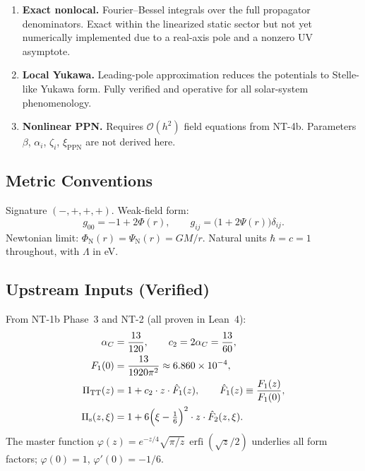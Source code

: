 \documentclass[11pt,a4paper]{article}
\newcommand{\PiTT}{\Pi_{\mathrm{TT}}}
\newcommand{\Pis}{\Pi_{\mathrm{s}}}
\newcommand{\Fhat}{\hat{F}}
\newcommand{\order}{\mathcal{O}}
\newcommand{\erfi}{\operatorname{erfi}}
\begin{document}
\begin{enumerate}[label=\textbf{Level \arabic*}:, leftmargin=4em]
  \item \textbf{Exact nonlocal.}  Fourier--Bessel integrals over the full
    propagator denominators.  Exact within the linearized static sector but
    not yet numerically implemented due to a real-axis pole and a nonzero
    UV asymptote.

  \item \textbf{Local Yukawa.}  Leading-pole approximation reduces the
    potentials to Stelle-like Yukawa form.  Fully verified and operative
    for all solar-system phenomenology.

  \item \textbf{Nonlinear PPN.}  Requires $\order(h^2)$ field equations
    from NT-4b.  Parameters $\beta$, $\alpha_i$, $\zeta_i$,
    $\xi_\mathrm{PPN}$ are not derived here.
\end{enumerate}

\subsection{Metric Conventions}

Signature $(-,+,+,+)$.  Weak-field form:
\begin{equation}\label{eq:metric}
  g_{00} = -1 + 2\Phi(r), \qquad
  g_{ij} = \bigl(1 + 2\Psi(r)\bigr)\delta_{ij}.
\end{equation}
Newtonian limit: $\Phi_{\mathrm{N}}(r) = \Psi_{\mathrm{N}}(r) = GM/r$.
Natural units $\hbar = c = 1$ throughout, with $\Lambda$ in eV.

\subsection{Upstream Inputs (Verified)}

From NT-1b Phase~3 and NT-2 (all proven in Lean~4):
\begin{align}
  \alpha_C &= \frac{13}{120}, \qquad
  c_2 = 2\alpha_C = \frac{13}{60}, \label{eq:alpha_c2} \\
  F_1(0) &= \frac{13}{1920\pi^2} \approx 6.860 \times 10^{-4}, \\
  \PiTT(z) &= 1 + c_2 \cdot z \cdot \Fhat_1(z), \qquad
  \Fhat_1(z) \equiv \frac{F_1(z)}{F_1(0)}, \\
  \Pis(z,\xi) &= 1 + 6\Bigl(\xi - \tfrac{1}{6}\Bigr)^2 \cdot z \cdot \Fhat_2(z,\xi).
\end{align}
The master function $\varphi(z) = e^{-z/4}\sqrt{\pi/z}\,\erfi(\sqrt{z}/2)$
underlies all form factors; $\varphi(0) = 1$, $\varphi'(0) = -1/6$.
\end{document}
